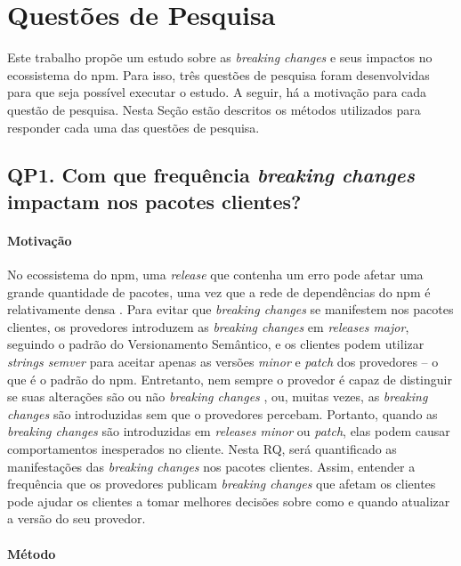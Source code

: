 \chapter{Questões de Pesquisa}
\label{cap:qp}

Este trabalho propõe um estudo sobre as \textit{breaking changes} e seus impactos no ecossistema do \gls{npm}. Para isso, três questões de pesquisa foram desenvolvidas para que seja possível executar o estudo. A seguir, há a motivação para cada questão de pesquisa. Nesta Seção estão descritos os métodos utilizados para responder cada uma das questões de pesquisa.

\section{QP1. Com que frequência \textit{breaking changes} impactam nos pacotes clientes?}
\label{sec:qp1}

\subsubsection{Motivação}
\label{sec:qp1:motivation}
No ecossistema do \gls{npm}, uma \textit{release} que contenha um erro pode afetar uma grande quantidade de pacotes, uma vez que a rede de dependências do npm é relativamente densa \cite{teorical_reference:npm_2}. Para evitar que \textit{breaking changes} se manifestem nos pacotes clientes, os provedores introduzem as \textit{breaking changes} em \textit{releases major}, seguindo o padrão do Versionamento Semântico, e os clientes podem utilizar \textit{strings semver} para aceitar apenas as versões \textit{minor} e \textit{patch} dos provedores -- o que é o padrão do \gls{npm}. Entretanto, nem sempre o provedor é capaz de distinguir se suas alterações são ou não \textit{breaking changes} \cite{noregrets2018}, ou, muitas vezes, as \textit{breaking changes} são introduzidas sem que o provedores percebam. Portanto, quando as \textit{breaking changes} são introduzidas em \textit{releases minor} ou \textit{patch}, elas podem causar comportamentos inesperados no cliente. Nesta RQ, será quantificado as manifestações das \textit{breaking changes} nos pacotes clientes. Assim, entender a frequência que os provedores publicam \textit{breaking changes} que afetam os clientes pode ajudar os clientes a tomar melhores decisões sobre como e quando atualizar a versão do seu provedor.

\subsubsection{Método}
\label{sec:qp1:approach}

